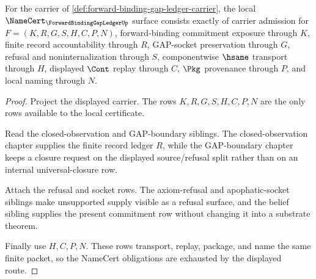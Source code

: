 \begin{theorem}
\label{thm:forward-binding-gap-ledger-namecert-obligations}
For the carrier of \autoref{def:forward-binding-gap-ledger-carrier}, the local $\NameCert_{\ForwardBindingGapLedgerUp}$ surface consists exactly of carrier admission for $F=(K,R,G,S,H,C,P,N)$, forward-binding commitment exposure through $K$, finite record accountability through $R$, GAP-socket preservation through $G$, refusal and noninternalization through $S$, componentwise $\hsame$ transport through $H$, displayed $\Cont$ replay through $C$, $\Pkg$ provenance through $P$, and local naming through $N$.
\end{theorem}
\begin{proof}
Project the displayed carrier. The rows $K,R,G,S,H,C,P,N$ are the only rows available to the local certificate.

Read the closed-observation and GAP-boundary siblings. The closed-observation chapter supplies the finite record ledger $R$, while the GAP-boundary chapter keeps a closure request on the displayed source/refusal split rather than on an internal universal-closure row.

Attach the refusal and socket rows. The axiom-refusal and apophatic-socket siblings make unsupported supply visible as a refusal surface, and the belief sibling supplies the present commitment row without changing it into a substrate theorem.

Finally use $H,C,P,N$. These rows transport, replay, package, and name the same finite packet, so the NameCert obligations are exhausted by the displayed route.
\end{proof}

